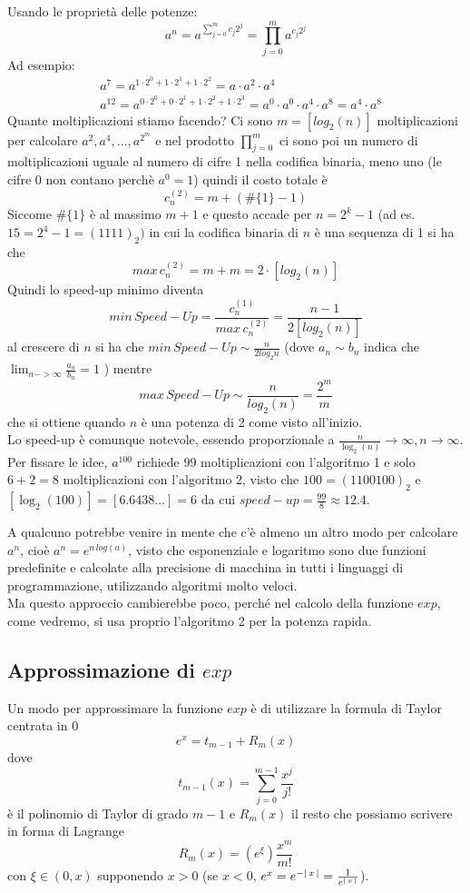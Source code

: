\documentclass[12pt]{article}
\DeclarePairedDelimiter{\abs}{\lvert}{\rvert}
\begin{document}
\bigskip
Usando le proprietà delle potenze:
\[ a^n=a^{\sum_{j=0}^{m} c_j 2^j}=\prod_{j=0}^{m} a^{c_j 2^j} \]
Ad esempio:
\[\begin{split}
	& a^7=a^{1\cdot 2^0 + 1\cdot 2^1 + 1\cdot 2^2}=a\cdot a^2\cdot a^4 \\
	& a^{12}=a^{0\cdot 2^0+0\cdot 2^1+1\cdot 2^2+1\cdot 2^3} = a^0\cdot a^0\cdot a^4\cdot a^8 =a^4\cdot a^8 
\end{split}\]
Quante moltiplicazioni stiamo facendo? Ci sono $m=[log_{2}(n)]$ moltiplicazioni per calcolare $a^2 , a^4 , \dotsc , a^{2^m}$ e nel prodotto $\prod_{j=0}^m$ ci sono poi un numero di moltiplicazioni uguale al numero di cifre 1 nella codifica binaria, meno uno (le cifre 0 non contano perchè $a^0=1$) quindi il costo totale è \[c_n^{(2)}=m+(\#\{1\}-1)\]
Siccome $\#\{1\}$ è al massimo $m+1$ e questo accade per $n=2^k-1$ (ad es. $15=2^4-1=(1111)_2)$ in cui la codifica binaria di $n$ è una sequenza di 1 si ha che
\[max\,c_n^{(2)} = m+m = 2\cdot [log_2(n)]\]
Quindi lo speed-up minimo diventa
\[min\,Speed-Up=\frac{c^{(1)}_n}{max\,c^{(2)}_n} = \frac{n-1}{2[log_2(n)]}\]
al crescere di $n$ si ha che $min\,Speed-Up \sim \frac{n}{2log_{2}n}$ (dove $a_n \sim b_n$ indica che $\lim_{n->\infty} \frac{a_n}{b_n}=1$ ) mentre 
\[max\,Speed-Up \sim \frac{n}{log_{2}(n)} = \frac{2^m}{m}\]
che si ottiene quando $n$ è una potenza di 2 come visto all'inizio. \\
Lo speed-up è comunque notevole, essendo proporzionale a $\frac{n}{\log_2(n)} \to \infty, n\to \infty$. \\
Per fissare le idee, $a^{100}$ richiede $99$ moltiplicazioni con l'algoritmo 1 e solo $6+2=8$ moltiplicazioni con l'algoritmo 2, visto che $100=(1100100)_2$ e $[\log_2(100)]=[6.6438\dotsc]=6$ da cui $speed-up=\frac{99}{8}\approx 12.4$.

\bigskip
A qualcuno potrebbe venire in mente che c'è almeno un altro modo per calcolare $a^n$, cioè $a^n=e^{n\,log(a)}$, visto che esponenziale e logaritmo sono due funzioni predefinite e calcolate alla precisione di macchina in tutti i linguaggi di programmazione, utilizzando algoritmi molto veloci. \\
Ma questo approccio cambierebbe poco, perché nel calcolo della funzione $exp$, come vedremo, si usa proprio l'algoritmo 2 per la potenza rapida.

\subsection{Approssimazione di $exp$}
Un modo per approssimare la funzione $exp$ è di utilizzare la formula di Taylor centrata in 0
\[e^x=t_{m-1}+R_m(x)\]
dove 
\[t_{m-1}(x)=\sum_{j=0}^{m-1}\frac{x^j}{j!}\]
è il polinomio di Taylor di grado $m-1$ e $R_m(x)$ il resto che possiamo scrivere in forma di Lagrange
\[R_m(x)=(e^{\xi})\frac{x^m}{m!}\]
con $\xi\in(0,x) $ supponendo $x>0$ (se $x<0$, $e^x=e^{-\abs{\,x\,}}=\frac{1}{e^{\abs{\,x\,}}}$).\\
\end{document}
